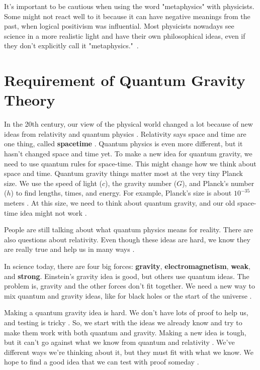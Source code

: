\documentclass[11pt]{article}
\begin{document}
It's important to be cautious when using the word "metaphysics" with physicists. Some might not react well to it because it can have negative meanings from the past, when logical positivism was influential. Most physicists nowadays see science in a more realistic light and have their own philosophical ideas, even if they don't explicitly call it "metaphysics."~\cite{deharoforthcoming,Teh2016-TEHGAG-2}.



\section{Requirement of Quantum Gravity Theory}

In the 20th century, our view of the physical world changed a lot because of new ideas from relativity \cite{belot2011background} and quantum physics \cite{zettili2009quantum,greene1999elegant,thorne1995black}. Relativity says space and time are one thing, called \textbf{spacetime }\cite{carroll2004spacetime}. Quantum physics is even more different, but it hasn't changed space and time yet. To make a new idea for quantum gravity, we need to use quantum rules for space-time. This might change how we think about space and time. Quantum gravity things matter most at the very tiny Planck size. We use the speed of light ($c$), the gravity number ($G$), and Planck's number ($h$) to find lengths, times, and energy. For example, Planck's size is about $10^{-35}$ meters \cite{callender2001physics}. At this size, we need to think about quantum gravity, and our old space-time idea might not work \cite{rovelli2004quantum}.

People are still talking about what quantum physics means for reality. There are also questions about relativity. Even though these ideas are hard, we know they are really true and help us in many ways \cite{hawking1988brief}.

In science today, there are four big forces: \textbf{gravity}, \textbf{electromagnetism}, \textbf{weak}, and \textbf{strong}. Einstein's gravity idea is good, but others use quantum ideas. The problem is, gravity and the other forces don't fit together. We need a new way to mix quantum and gravity ideas, like for black holes or the start of the universe \cite{smolin2006trouble,thorne1995black,hawking1996nature}.

Making a quantum gravity idea is hard. We don't have lots of proof to help us, and testing is tricky \cite{cox2012quantum}. So, we start with the ideas we already know and try to make them work with both quantum and gravity. Making a new idea is tough, but it can't go against what we know from quantum and relativity \cite{zettili2009quantum}. We've different ways we're thinking about it, but they must fit with what we know. We hope to find a good idea that we can test with proof someday \cite{hawking1996nature}.
\end{document}
